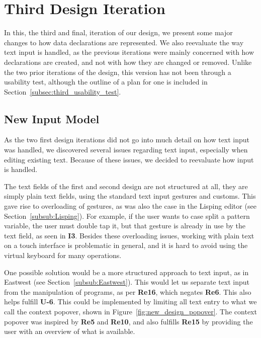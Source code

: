 \chapter{Third Design Iteration}
\label{sec:third_design_iteration}
In this, the third and final, iteration of our design, we present some major changes to how data declarations are represented.
We also reevaluate the way text input is handled, as the previous iterations were mainly concerned with how declarations are created, and not with how they are changed or removed.
Unlike the two prior iterations of the design, this version has not been through a usability test, although the outline of a plan for one is included in Section~\ref{subsec:third_usability_test}.

\section{New Input Model}
\label{subsec:new_input_model}
As the two first design iterations did not go into much detail on how text input was handled, we discovered several issues regarding text input, especially when editing existing text.
Because of these issues, we decided to reevaluate how input is handled.

The text fields of the first and second design are not structured at all, they are simply plain text fields, using the standard text input gestures and customs.
This gave rise to overloading of gestures, as was also the case in the Lisping editor (see Section~\ref{subsub:Lisping}).
For example, if the user wants to case split a pattern variable, the user must double tap it, but that gesture is already in use by the text field, as seen in \textbf{I3}.
Besides these overloading issues, working with plain text on a touch interface is problematic in general, and it is hard to avoid using the virtual keyboard for many operations.

One possible solution would be a more structured approach to text input, as in Eastwest (see Section~\ref{subsub:Eastwest}).
This would let us separate text input from the manipulation of programs, as per \textbf{Re16}, which negates \textbf{Re6}. This also helps fulfill \textbf{U-6}.
This could be implemented by limiting all text entry to what we call the context popover, shown in Figure~\ref{fig:new_design_popover}.
The context popover was inspired by \textbf{Re5} and \textbf{Re10}, and also fulfills \textbf{Re15} by providing the user with an overview of what is available.

